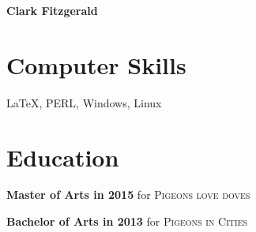 \documentclass{article}
\begin{document}
\begin{center}
        \huge\textbf{Clark Fitzgerald}
\end{center}

\section{Computer Skills}
\LaTeX, PERL, Windows, Linux
\section{Education}
\textbf{Master of Arts in 2015} 
for \textsc{Pigeons love doves}\par
\textbf{Bachelor of Arts in 2013} 
for \textsc{Pigeons in Cities}

%

\nocite{*}
\printbibliography[keyword=software, title={Software}]
\printbibliography[keyword=talk, title={Conference Talks}]
\end{document}
